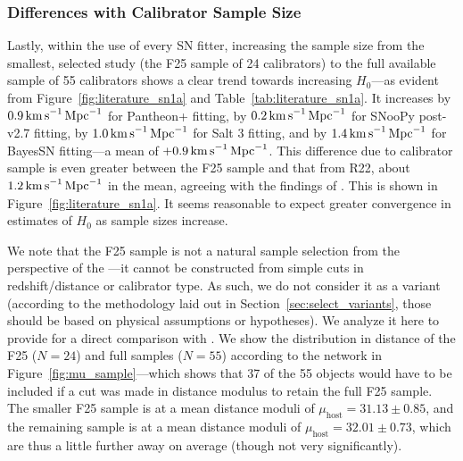 \subsubsection{Differences with Calibrator Sample Size}

Lastly, within the use of every SN fitter, increasing the sample size from the smallest, selected study (the F25 sample of 24 calibrators) to the full available sample of 55 calibrators shows a clear trend towards increasing $H_0$---as evident from Figure~\ref{fig:literature_sn1a} and Table~\ref{tab:literature_sn1a}. It increases by $0.9\,{\rm km\,s}^{-1}{\rm\,Mpc}^{-1}$ for Pantheon+ fitting, by $0.2\,{\rm km\,s}^{-1}{\rm\,Mpc}^{-1}$ for SNooPy post-v2.7 fitting, by $1.0\,{\rm km\,s}^{-1}{\rm\,Mpc}^{-1}$ for Salt 3 fitting, and by $1.4\,{\rm km\,s}^{-1}{\rm\,Mpc}^{-1}$ for BayesSN fitting---a mean of $+0.9 \,{\rm km\,s}^{-1}{\rm\,Mpc}^{-1}$. This difference due to calibrator sample is even greater between the F25 sample and that from R22, about $1.2 \,{\rm km\,s}^{-1}{\rm\,Mpc}^{-1}$ in the mean, agreeing with the findings of \cite{2024ApJ...977..120R}. This is shown in Figure~\ref{fig:literature_sn1a}. It seems reasonable to expect greater convergence in estimates of $H_0$ as sample sizes increase.

We note that the F25 sample is not a natural sample selection from the perspective of the \DN{}---it cannot be constructed from simple cuts in redshift/distance or calibrator type. As such, we do not consider it as a variant (according to the methodology laid out in Section~\ref{sec:select_variants}, those should be based on physical assumptions or hypotheses). We analyze it here to provide for a direct comparison with \citet{2025ApJ...985..203F}. We show the distribution in distance of the F25 ($N=24$) and full samples ($N=55$) according to the network in Figure~\ref{fig:mu_sample}---which shows that 37 of the 55 objects would have to be included if a cut was made in distance modulus to retain the full F25 sample. The smaller F25 sample is at a mean distance moduli of $\mu_\mathrm{host} = 31.13 \pm 0.85$, and the remaining sample is at a mean distance moduli of $\mu_\mathrm{host} = 32.01 \pm 0.73$, which are thus a little further away on average (though not very significantly). 

